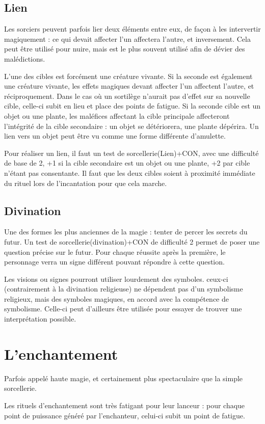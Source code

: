 \documentclass[10pt,a4paper,twocolumn]{book}
\begin{document}
\subsection*{Lien}
Les sorciers peuvent parfois lier deux éléments entre eux, de façon à les intervertir magiquement : ce qui devait affecter l'un affectera l'autre, et inversement. Cela peut être utilisé pour nuire, mais est le plus souvent utilisé afin de dévier des malédictions.

L'une des cibles est forcément une créature vivante.
Si la seconde est également une créature vivante, les effets magiques devant affecter l'un affectent l'autre, et réciproquement. Dans le cas où un sortilège n'aurait pas d'effet sur sa nouvelle cible, celle-ci subit en lieu et place des points de fatigue.
Si la seconde cible est un objet ou une plante, les maléfices affectant la cible principale affecteront l'intégrité de la cible secondaire : un objet se détériorera, une plante dépérira. Un lien vers un objet peut être vu comme une forme différente d'amulette. 

Pour réaliser un lien, il faut un test de sorcellerie(Lien)+CON, avec une difficulté de base de 2, +1 si la cible secondaire est un objet ou une plante, +2 par cible n'étant pas consentante. Il faut que les deux cibles soient à proximité immédiate du rituel lors de l'incantation pour que cela marche.
\subsection*{Divination}
Une des formes les plus anciennes de la magie : tenter de percer les secrets du futur. Un test de sorcellerie(divination)+CON de difficulté 2 permet de poser une question précise sur le futur. Pour chaque réussite après la première, le personnage verra un signe différent pouvant répondre à cette question.

Les visions ou signes pourront utiliser lourdement des symboles. ceux-ci (contrairement à la divination religieuse) ne dépendent pas d'un symbolisme religieux, mais des symboles magiques, en accord avec la compétence de symbolisme. Celle-ci peut d'ailleurs être utilisée pour essayer de trouver une interprétation possible.
\section{L'enchantement}
Parfois appelé haute magie, et certainement plus spectaculaire que la simple sorcellerie.

Les rituels d'enchantement sont très fatigant pour leur lanceur : pour chaque point de puissance généré par l'enchanteur, celui-ci subit un point de fatigue.
\end{document}
